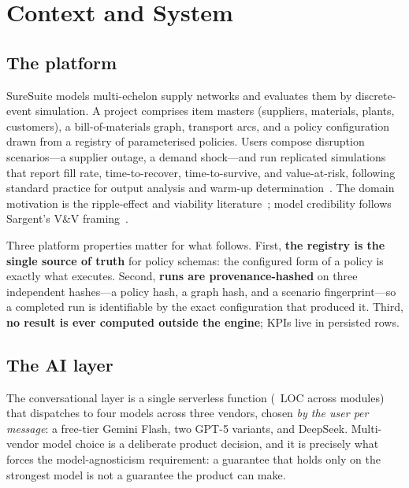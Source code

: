 \documentclass[conference]{IEEEtran}
\begin{document}
\section{Context and System}
\label{sec:context}

\subsection{The platform}

SureSuite models multi-echelon supply networks and evaluates them by
discrete-event simulation. A project comprises item masters (suppliers,
materials, plants, customers), a bill-of-materials graph, transport arcs, and a
policy configuration drawn from a registry of parameterised policies. Users
compose disruption scenarios---a supplier outage, a demand shock---and run
replicated simulations that report fill rate, time-to-recover, time-to-survive,
and value-at-risk, following standard practice for output analysis and warm-up
determination~\cite{law2015simulation,welch1983warmup}. The domain motivation is
the ripple-effect and viability literature~\cite{ivanov2020ripple,ivanov2021viable};
model credibility follows Sargent's V\&V framing~\cite{sargent2013vv}.

Three platform properties matter for what follows. First, \textbf{the registry is
the single source of truth} for policy schemas: the configured form of a policy
is exactly what executes. Second, \textbf{runs are provenance-hashed} on three
independent hashes---a policy hash, a graph hash, and a scenario
fingerprint---so a completed run is identifiable by the exact configuration that
produced it. Third, \textbf{no result is ever computed outside the engine};
KPIs live in persisted rows.

\subsection{The AI layer}

The conversational layer is a single serverless function
(\HarnessLoc{}~LOC across \HarnessModules{} modules) that dispatches to four
models across three vendors, chosen \emph{by the user per message}: a free-tier
Gemini Flash, two GPT-5 variants, and DeepSeek. Multi-vendor model choice is a
deliberate product decision, and it is precisely what forces the
model-agnosticism requirement: a guarantee that holds only on the strongest model
is not a guarantee the product can make.
\end{document}

